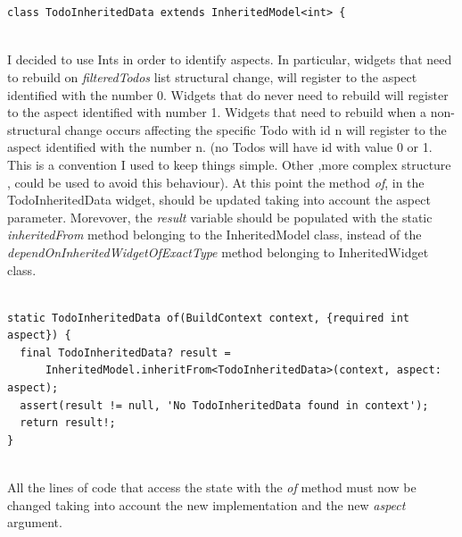 \mbox{}\\
\begin{code}
\mbox{}
\label{code:2.44}
\begin{verbatim}

class TodoInheritedData extends InheritedModel<int> {
\end{verbatim}
\end{code}
\mbox{}\\
I decided to use Ints in order to identify aspects. In particular, widgets that need to rebuild on \textit{filteredTodos} list structural change, will register to the aspect identified with the number 0. Widgets that do never need to rebuild will register to the aspect identified with number 1. Widgets that need to rebuild when a non-structural change occurs affecting the specific Todo with id n  will register to the aspect identified with the number n. (no Todos will have id with value 0 or 1. This is a convention I used to keep things simple. Other ,more complex structure , could be used to avoid this behaviour). 
At this point the method \textit{of}, in the TodoInheritedData widget, should be updated taking into account the aspect parameter. Morevover, the \textit{result} variable should be populated with the static \textit{inheritedFrom  } method belonging to the InheritedModel class, instead of the \textit{dependOnInheritedWidgetOfExactType} method belonging to InheritedWidget class.
\mbox{}\\
\begin{code}
\mbox{}
\label{code:2.45}
\begin{verbatim}

static TodoInheritedData of(BuildContext context, {required int aspect}) {
  final TodoInheritedData? result =
      InheritedModel.inheritFrom<TodoInheritedData>(context, aspect: aspect);
  assert(result != null, 'No TodoInheritedData found in context');
  return result!;
}
\end{verbatim}
\end{code}
\mbox{}\\
All the lines of code that access the state with the \textit{of} method must now be changed taking into account the new implementation and the new \textit{aspect} argument.
\mbox{}\\

